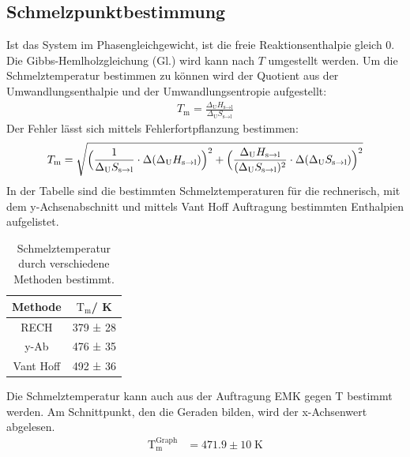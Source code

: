 \documentclass[12pt,a4paper,titlepage,headinclude,bibtotoc]{scrartcl}
\begin{document}
\subsection{Schmelzpunktbestimmung}
Ist das System im Phasengleichgewicht, ist die freie Reaktionsenthalpie gleich 0. Die Gibbs-Hemlholzgleichung (Gl.) wird kann nach $T$ umgestellt werden. Um die Schmelztemperatur bestimmen zu können wird der Quotient aus der Umwandlungsenthalpie und der Umwandlungsentropie aufgestellt:
\begin{align}
{T}_{\text{m}}= \frac{\Delta_\text{U} H_{\text{s}\rightarrow\text{l}}}{\Delta_\text{U} S_{\text{s}\rightarrow\text{l}}}
\end{align}
Der Fehler lässt sich mittels Fehlerfortpflanzung bestimmen:
\begin{align}
{T}_{\text{m}}= \sqrt{\Bigl(\frac{1}{\Delta_\text{U} S_{\text{s}\rightarrow\text{l}}}\cdot \Delta(\Delta_\text{U} H_{\text{s}\rightarrow\text{l}})\Bigr)^2+\Bigl(\frac{\Delta_\text{U} H_{\text{s}\rightarrow\text{l}}}{(\Delta_\text{U} S_{\text{s}\rightarrow\text{l}})^2}\cdot \Delta(\Delta_\text{U} S_{\text{s}\rightarrow\text{l}})\Bigr)^2}
\end{align}
In der Tabelle sind die bestimmten Schmelztemperaturen für die rechnerisch, mit dem y-Achsenabschnitt und mittels Vant Hoff Auftragung bestimmten Enthalpien aufgelistet.
\begin{table}[h]
\centering
\caption{Schmelztemperatur durch verschiedene Methoden bestimmt.}
\begin{tabular}{c|c}
Methode & $\text{T}_{\text{m}}$/ K\\
\hline
RECH &379 ± 28 \\
y-Ab&476 ± 35\\
Vant Hoff&492 ± 36\\
\end{tabular}
\end{table}
\FloatBarrier
Die Schmelztemperatur kann auch aus der Auftragung EMK gegen T bestimmt werden. Am Schnittpunkt, den die Geraden bilden, wird der x-Achsenwert abgelesen. 
\begin{align}
\text{T}_{\text{m}}^{\text{Graph}}&= 471.9 \pm 10\;\text{K}
\end{align}
\end{document}
